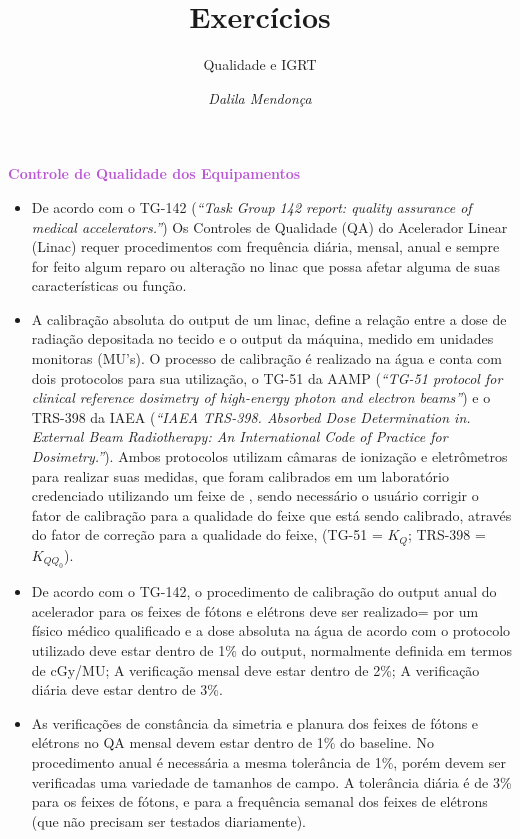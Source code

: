 \documentclass[11pt,a4paper]{article}
\title{\LobsterTwo\Huge{Exercícios}}
\author{\LobsterTwo\Large{Qualidade e IGRT}\nocite{*}}
\date{\LobsterTwo{Dalila Mendonça}}
\date{\textit{Dalila Mendonça}}
\newcounter{exemplo}
\begin{document}
	\maketitle


\begin{exemplo}[Qualidade]

    \textcolor{MediumOrchid}{\LobsterTwo\textbf{Controle de Qualidade dos Equipamentos}}
    \begin{itemize}
        \item De acordo com o TG-142 (\textit{``Task Group 142 report: quality assurance of medical accelerators.''}) Os Controles de Qualidade  (QA) do Acelerador Linear (Linac) requer procedimentos com frequência diária, mensal, anual e sempre for feito algum reparo ou alteração no linac que possa afetar alguma de suas características ou função.
        
        \item A calibração absoluta do output de um linac, define a relação entre a dose de radiação depositada no tecido e o output da máquina, medido em unidades monitoras (MU's). O processo de calibração é realizado na água e conta com dois protocolos para sua utilização, o TG-51 da AAMP (\textit{``TG-51 protocol for clinical reference dosimetry of high-energy photon and electron beams''}) e o TRS-398 da IAEA (\textit{``IAEA TRS-398. Absorbed Dose Determination in. External Beam Radiotherapy: An International Code of Practice for Dosimetry.''}). Ambos protocolos utilizam câmaras de ionização e eletrômetros para realizar suas medidas, que foram calibrados em um laboratório credenciado utilizando um feixe de , sendo necessário o usuário corrigir o fator de calibração para a qualidade do feixe que está sendo calibrado, através do fator de correção para a qualidade do feixe, (TG-51 = $K_Q$; TRS-398 = $K_{QQ_0}$).
        
        \item De acordo com o TG-142, o procedimento de calibração do output anual do acelerador para os feixes de fótons e elétrons deve ser realizado= por um físico médico qualificado e a dose absoluta na água de acordo com o protocolo utilizado deve estar dentro de 1\% do output, normalmente definida em termos de cGy/MU; A verificação mensal deve estar dentro de 2\%; A verificação diária deve estar dentro de 3\%. 
        \item As verificações de constância da simetria e planura dos feixes de fótons e elétrons no QA mensal devem estar dentro de 1\% do baseline. No procedimento anual é necessária a mesma tolerância de 1\%, porém devem ser verificadas uma variedade de tamanhos de campo. A tolerância diária é de 3\% para os feixes de fótons, e para a frequência semanal dos feixes de elétrons (que não precisam ser testados diariamente).
        

\end{itemize}
\end{exemplo}
\end{document}
